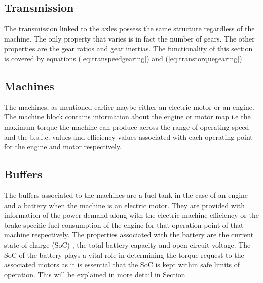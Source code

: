 \documentclass[ExampleMasters.tex]{subfiles}
\begin{document}
\subsection{Transmission}\label{sec:transtructure}
The transmission linked to the axles possess the same structure regardless of the machine. The only property that varies is in fact the number of gears. The other properties are the gear ratios and gear inertias. The functionality of this section is covered by equations (\ref{eq:transpeedgearing}) and (\ref{eq:transtorquegearing})

\subsection{Machines}\label{sec:machinestructure}
The machines, as mentioned earlier maybe either an electric motor or an engine. The machine block contains information about the engine or motor map i.e the maximum torque the machine can produce across the range of operating speed and the b.s.f.c. values and efficiency values associated with each operating point for the engine and motor respectively.  

\subsection{Buffers} \label{sec:bufferstructure}
The buffers associated to the machines are a fuel tank in the case of an engine and a battery when the machine is an electric motor. They are provided with information of the power demand along with the electric machine efficiency or the brake specific fuel consumption of the engine for that operation point of that machine respectively.  
The properties associated with the battery are the current state of charge (SoC) , the total battery capacity and open circuit voltage. The SoC of the battery plays a vital role in determining the torque request to the associated motors as it is essential that the SoC is kept within safe limits of operation. This will be explained in more detail in Section %
\end{document}

